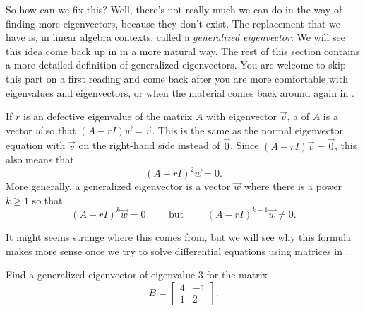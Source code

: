 So how can we fix this? Well, there's not really much we can do in the way of finding more eigenvectors, because they don't exist. The replacement that we have is, in linear algebra contexts, called a \emph{generalized eigenvector}. We will see this idea come back up in  in a more natural way. The rest of this section contains a more detailed definition of generalized eigenvectors. You are welcome to skip this part on a first reading and come back after you are more comfortable with eigenvalues and eigenvectors, or when the material comes back around again in .

If $r$ is an defective eigenvalue of the matrix $A$ with eigenvector $\vec{v}$, a \emph{} of $A$ is a vector $\vec{w}$ so that $(A - rI)\vec{w} = \vec{v}$. This is the same as the normal eigenvector equation with $\vec{v}$ on the right-hand side instead of $\vec{0}$. Since $(A - rI)\vec{v} = \vec{0}$, this also means that \[ (A - rI)^2\vec{w} = 0. \] More generally, a generalized eigenvector is a vector $\vec{w}$ where there is a power $k \geq 1$ so that
\[ (A - rI)^k\vec{w} = 0 \qquad \text{ but } \qquad (A - rI)^{k-1}\vec{w} \neq 0. \]

It might seems strange where this comes from, but we will see why this formula makes more sense once we try to solve differential equations using matrices in .

\begin{example}
Find a generalized eigenvector of eigenvalue $3$ for the matrix 
\[ B = \begin{bmatrix} 4 & -1 \\ 1 & 2 \end{bmatrix}.\]
\end{example}

